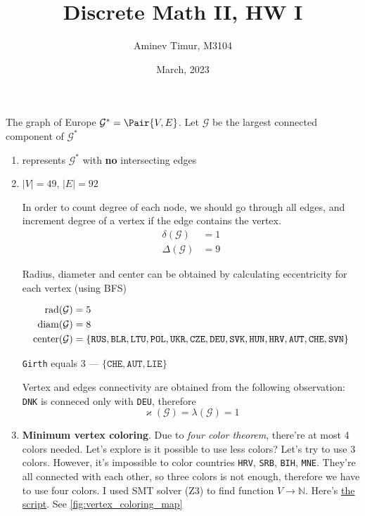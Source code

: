 \documentclass[12pt, a4paper]{article}
\title{Discrete Math II, HW I}
\date{March, 2023}
\author{Aminev Timur, M3104}
\newcommand\EGraph{\mathcal{G}^{*}}
\newcommand\EGraphL{\mathcal{G}}
\begin{document}
\maketitle

\problem The graph of Europe \(\EGraph = \Pair{V, E}\). Let \(\EGraphL\) be the
largest connected component of \(\EGraph\)

\begin{enumerate}[label=\alph*)]
\item {} represents \(\EGraph\) with \textbf{no} intersecting
edges
\item \(|V| = 49\), \(|E| = 92\)

In order to count degree of each node, we should go through all edges, and
increment degree of a vertex if the edge contains the vertex. %
\begin{align*}
\delta(\EGraphL) &= 1 \\
\Delta(\EGraphL) &= 9
\end{align*}

Radius, diameter and center can be obtained by calculating eccentricity for
each vertex (using BFS)

\begin{align*}
\rad(\EGraphL) &= 5 \\
\diam(\EGraphL) &= 8 \\
\mycenter(\EGraphL) &= \{\texttt{RUS}, \texttt{BLR}, \texttt{LTU}, \texttt{POL}, \texttt{UKR}, \texttt{CZE}, \texttt{DEU}, \texttt{SVK}, \texttt{HUN}, \texttt{HRV}, \texttt{AUT}, \texttt{CHE}, \texttt{SVN}\}
\end{align*}

\texttt{Girth} equals 3 --- \(\{\texttt{CHE}, \texttt{AUT}, \texttt{LIE}\}\)

Vertex and edges connectivity are obtained from the following observation:
\texttt{DNK} is conneced only with \texttt{DEU}, therefore
\[\varkappa(\EGraphL) = \lambda(\EGraphL) = 1\]

\item \textbf{Minimum vertex coloring}. Due to \textit{four color theorem},
there're at most 4 colors needed. Let's explore is it possible to use less
colors? Let's try to use 3 colors. However, it's impossible to color countries
\texttt{HRV}, \texttt{SRB}, \texttt{BIH}, \texttt{MNE}. They're all connected
with each other, so three colors is not enough, therefore we have to use four
colors. I used SMT solver (Z3) to find function \(V \to \mathbb{N}\). Here's
\href{https://github.com/ablearthy-itmo-39828cf299f04949c86/discrete-math-2-hw-1/blob/753891b/auto/vertex_coloring.py}{the
script}. See \cref{fig:vertex_coloring_map}


\end{enumerate}
\end{document}
